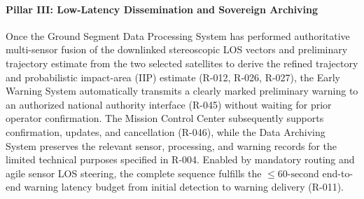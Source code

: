 \paragraph{Pillar III: Low-Latency Dissemination and Sovereign Archiving}
Once the Ground Segment Data Processing System has performed authoritative multi-sensor fusion of the downlinked stereoscopic LOS vectors and preliminary trajectory estimate from the two selected  satellites to derive the refined trajectory and probabilistic impact-area (IIP) estimate (R-012, R-026, R-027), the Early Warning System automatically transmits a clearly marked preliminary warning to an authorized national authority interface (R-045) without waiting for prior operator confirmation. The Mission Control Center subsequently supports confirmation, updates, and cancellation (R-046), while the Data Archiving System preserves the relevant sensor, processing, and warning records for the limited technical purposes specified in R-004. Enabled by mandatory  routing and agile sensor LOS steering, the complete sequence fulfills the $\le 60\text{-second}$ end-to-end warning latency budget from initial  detection to warning delivery (R-011). 